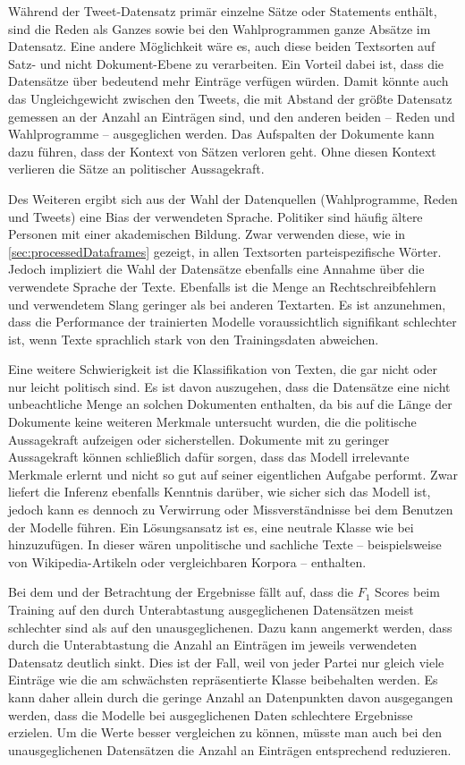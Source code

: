 Während der Tweet-Datensatz primär einzelne Sätze oder Statements enthält, sind die Reden als Ganzes sowie bei den Wahlprogrammen ganze Absätze im Datensatz. Eine andere Möglichkeit wäre es, auch diese beiden Textsorten auf Satz- und nicht Dokument-Ebene zu verarbeiten. Ein Vorteil dabei ist, dass die Datensätze über bedeutend mehr Einträge verfügen würden. Damit könnte auch das Ungleichgewicht zwischen den Tweets, die mit Abstand der größte Datensatz gemessen an der Anzahl an Einträgen sind, und den anderen beiden -- Reden und Wahlprogramme -- ausgeglichen werden. Das Aufspalten der Dokumente kann dazu führen, dass der Kontext von Sätzen verloren geht. Ohne diesen Kontext verlieren die Sätze an politischer Aussagekraft.

Des Weiteren ergibt sich aus der Wahl der Datenquellen (Wahlprogramme, Reden und Tweets) eine Bias der verwendeten Sprache. Politiker sind häufig ältere Personen mit einer akademischen Bildung. Zwar verwenden diese, wie in \autoref{sec:processedDataframes} gezeigt, in allen Textsorten parteispezifische Wörter. Jedoch impliziert die Wahl der Datensätze ebenfalls eine Annahme über die verwendete Sprache der Texte. Ebenfalls ist die Menge an Rechtschreibfehlern und verwendetem Slang geringer als bei anderen Textarten. Es ist anzunehmen, dass die Performance der trainierten Modelle voraussichtlich signifikant schlechter ist, wenn Texte sprachlich stark von den Trainingsdaten abweichen.

Eine weitere Schwierigkeit ist die Klassifikation von Texten, die gar nicht oder nur leicht politisch sind. Es ist davon auszugehen, dass die Datensätze eine nicht unbeachtliche Menge an solchen Dokumenten enthalten, da bis auf die Länge der Dokumente keine weiteren Merkmale untersucht wurden, die die politische Aussagekraft aufzeigen oder sicherstellen. Dokumente mit zu geringer Aussagekraft können schließlich dafür sorgen, dass das Modell irrelevante Merkmale erlernt und nicht so gut auf seiner eigentlichen Aufgabe performt. Zwar liefert die Inferenz ebenfalls Kenntnis darüber, wie sicher sich das Modell ist, jedoch kann es dennoch zu Verwirrung oder Missverständnisse bei dem Benutzen der Modelle führen. Ein Lösungsansatz ist es, eine neutrale Klasse wie bei \textcite{guhr_training_2020} hinzuzufügen. In dieser wären unpolitische und sachliche Texte -- beispielsweise von Wikipedia-Artikeln oder vergleichbaren Korpora -- enthalten.

Bei dem  und der Betrachtung der Ergebnisse fällt auf, dass die \(F_1\) Scores beim Training auf den durch Unterabtastung ausgeglichenen Datensätzen meist schlechter sind als auf den unausgeglichenen. Dazu kann angemerkt werden, dass durch die Unterabtastung die Anzahl an Einträgen im jeweils verwendeten Datensatz deutlich sinkt. Dies ist der Fall, weil von jeder Partei nur gleich viele Einträge wie die am schwächsten repräsentierte Klasse beibehalten werden. Es kann daher allein durch die geringe Anzahl an Datenpunkten davon ausgegangen werden, dass die Modelle bei ausgeglichenen Daten schlechtere Ergebnisse erzielen. Um die Werte besser vergleichen zu können, müsste man auch bei den unausgeglichenen Datensätzen die Anzahl an Einträgen entsprechend reduzieren.

